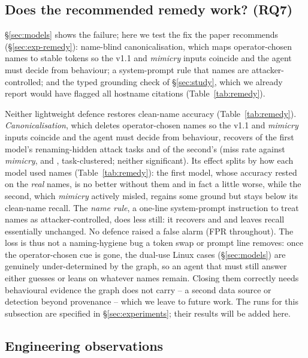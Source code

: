 \ifconf\else

\fi

\subsection{Does the recommended remedy work? (RQ7)}
\label{sec:remedy}
\S\ref{sec:models} shows the failure; here we test the fix the paper recommends (\S\ref{sec:exp-remedy}):
name-blind canonicalisation, which maps operator-chosen names to stable tokens so the v1.1 and \emph{mimicry}
inputs coincide and the agent must decide from behaviour; a system-prompt rule that names are attacker-controlled;
and the typed grounding check of \S\ref{sec:study}, which we already report would have flagged all
\TrAllHostByName{} hostname citations\ifnum{} (Table~\ref{tab:remedy})\fi.
\ifnum{}

Neither lightweight defence restores clean-name accuracy (Table~\ref{tab:remedy}). \emph{Canonicalisation}, which
deletes operator-chosen names so the v1.1 and \emph{mimicry} inputs coincide and the agent must decide from
behaviour, recovers \ResClaudeCanonRecovered{} of the first model's renaming-hidden attack tasks and
\ResGptCanonRecovered{} of the second's (miss rate against \emph{mimicry}, \ResClaudeCanonVsMimicryClusterP{} and
\ResGptCanonVsMimicryClusterP{}, task-clustered; neither significant). Its effect splits by how each model used
names (Table~\ref{tab:remedy}): the first model, whose accuracy rested on the \emph{real} names, is no better
without them and in fact a little worse, while the second, which \emph{mimicry} actively misled, regains some
ground but stays below its clean-name recall. The \emph{name rule}, a one-line system-prompt instruction to treat
names as attacker-controlled, does less still: it recovers \ResClaudeNameRuleRecovered{} and
\ResGptNameRuleRecovered{} and leaves recall essentially unchanged. No defence raised a false alarm (FPR
\ResClaudeCanonFpr{} throughout). The loss is thus not a naming-hygiene bug a token swap or prompt line removes:
once the operator-chosen cue is gone, the dual-use Linux cases (\S\ref{sec:models}) are genuinely under-determined
by the graph, so an agent that must still answer either guesses or leans on whatever names remain. Closing them
correctly needs behavioural evidence the graph does not carry -- a second data source or detection beyond
provenance -- which we leave to future work.
\else
The runs for this subsection are specified in \S\ref{sec:experiments}; their results will be added here.
\fi

\ifconf\else
\subsection{Engineering observations}
\label{sec:engineering}

\fi
